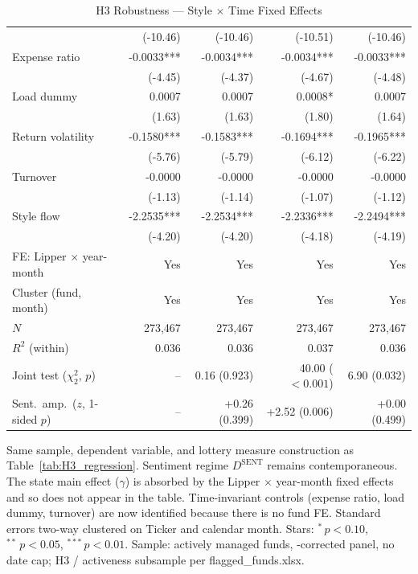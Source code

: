 \begin{table}[!htbp]
{\begin{tabular*}{\linewidth}{@{\extracolsep{\fill}}lrrrr}
 & (-10.46) & (-10.46) & (-10.51) & (-10.46)\\
Expense ratio & -0.0033*** & -0.0034*** & -0.0034*** & -0.0033***\\
 & (-4.45) & (-4.37) & (-4.67) & (-4.48)\\
Load dummy & 0.0007 & 0.0007 & 0.0008* & 0.0007\\
 & (1.63) & (1.63) & (1.80) & (1.64)\\
Return volatility & -0.1580*** & -0.1583*** & -0.1694*** & -0.1965***\\
 & (-5.76) & (-5.79) & (-6.12) & (-6.22)\\
Turnover & -0.0000 & -0.0000 & -0.0000 & -0.0000\\
 & (-1.13) & (-1.14) & (-1.07) & (-1.12)\\
Style flow & -2.2535*** & -2.2534*** & -2.2336*** & -2.2494***\\
 & (-4.20) & (-4.20) & (-4.18) & (-4.19)\\
\midrule
FE: Lipper $\times$ year-month & Yes & Yes & Yes & Yes\\
Cluster (fund, month) & Yes & Yes & Yes & Yes\\
$N$ & 273,467 & 273,467 & 273,467 & 273,467\\
$R^2$ (within) & 0.036 & 0.036 & 0.037 & 0.036\\
Joint test ($\chi^2_2$, $p$) & -- & 0.16 (0.923) & 40.00 ($<0.001$) & 6.90 (0.032)\\
Sent.\ amp.\ ($z$, 1-sided $p$) & -- & +0.26 (0.399) & +2.52 (0.006) & +0.00 (0.499)\\
\bottomrule
\end{tabular*}%
}\sbefit
\fi
\setlength{\tabletempwidth}{\wd\tabletempbox}
\ifdim\tabletempwidth>\linewidth\setlength{\tabletempwidth}{\linewidth}\fi
\begin{minipage}{\tabletempwidth}
\captionsetup{width=\linewidth}
\caption{H3 Robustness --- Style $\times$ Time Fixed Effects}\label{tab:H3_robustness}
\ifdim\wd\tabletempbox>\linewidth
  \resizebox{\linewidth}{!}{\usebox{\tabletempbox}}
\else
  \usebox{\tabletempbox}
\fi
\par\medskip
\begin{singlespace}\tablefont\noindent
Same sample, dependent variable, and lottery measure construction as Table~\ref{tab:H3_regression}. Sentiment regime $D^{\text{SENT}}$ remains contemporaneous. The state main effect ($\gamma$) is absorbed by the Lipper $\times$ year-month fixed effects and so does not appear in the table. Time-invariant controls (expense ratio, load dummy, turnover) are now identified because there is no fund FE. Standard errors two-way clustered on Ticker and calendar month. Stars: $^{*}\,p<0.10$, $^{**}\,p<0.05$, $^{***}\,p<0.01$. Sample: actively managed funds, \textcite{Evans2010}-corrected panel, no date cap; H3 / activeness subsample per flagged\_funds.xlsx.
\end{singlespace}
\end{minipage}
\end{table}

